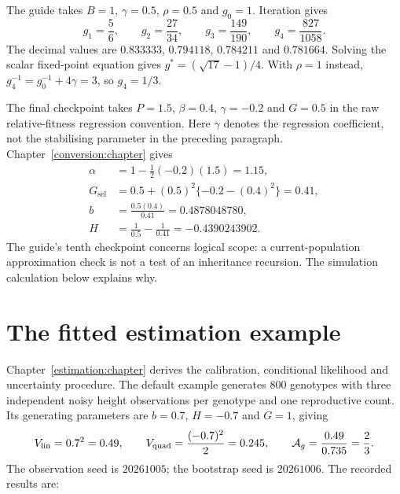 The guide takes $B=1$, $\gamma=0.5$, $\rho=0.5$ and $g_0=1$. Iteration gives
\[
 g_1=\frac56,\qquad g_2=\frac{27}{34},\qquad
 g_3=\frac{149}{190},\qquad g_4=\frac{827}{1058}.
\]
The decimal values are $0.833333$, $0.794118$, $0.784211$ and $0.781664$.
Solving the scalar fixed-point equation gives $g^*=(\sqrt{17}-1)/4$.
With $\rho=1$ instead, $g_4^{-1}=g_0^{-1}+4\gamma=3$, so $g_4=1/3$.

The final checkpoint takes $P=1.5$, $\beta=0.4$, $\gamma=-0.2$ and $G=0.5$ in the raw relative-fitness regression convention. Here $\gamma$ denotes the regression coefficient, not the stabilising parameter in the preceding paragraph. Chapter~\ref{conversion:chapter} gives
\begin{align}
 \alpha&=1-\tfrac12(-0.2)(1.5)=1.15,\\
 G_{\mathrm{sel}}&=0.5+(0.5)^2\{-0.2-(0.4)^2\}=0.41,\\
 b&=\frac{0.5(0.4)}{0.41}=0.4878048780,\\
 H&=\frac1{0.5}-\frac1{0.41}=-0.4390243902.
\end{align}
The guide's tenth checkpoint concerns logical scope: a current-population approximation check is not a test of an inheritance recursion. The simulation calculation below explains why.

\section{The fitted estimation example}
\label{worked:estimation}

Chapter~\ref{estimation:chapter} derives the calibration, conditional likelihood and uncertainty procedure. The default example generates 800 genotypes with three independent noisy height observations per genotype and one reproductive count. Its generating parameters are $b=0.7$, $H=-0.7$ and $G=1$, giving
\[
 V_{\mathrm{lin}}=0.7^2=0.49,\qquad
 V_{\mathrm{quad}}=\frac{(-0.7)^2}{2}=0.245,\qquad
 \mathcal A_g=\frac{0.49}{0.735}=\frac23.
\]
The observation seed is $20261005$; the bootstrap seed is $20261006$.
The recorded results are:

